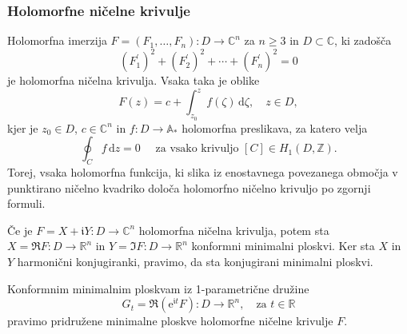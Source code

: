\documentclass[8pt]{beamer}
\theoremstyle{definition}
\theoremstyle{remark}
\theoremstyle{plain}
\numberwithin{equation}{section}  %
\begin{document}
\begin{frame}
    \frametitle{Holomorfne ničelne krivulje}

    Holomorfna imerzija $F=\left(F_1, \ldots, F_n\right): D \rightarrow \mathbb{C}^n$ za $n\geq 3$ in $D\subset \mathbb{C}$, ki zadošča  
    \begin{equation*}
        \left(F_1^{\prime}\right)^2+\left(F_2^{\prime}\right)^2+\cdots+\left(F_n^{\prime}\right)^2=0      
    \end{equation*}
    je \textcolor{red1}{holomorfna ničelna krivulja}. \pause Vsaka taka je oblike 
    \begin{equation*}
        F(z)=c+\int_{z_0}^z f(\zeta) \, \mathrm{d} \zeta, \quad z \in D,
    \end{equation*}
    kjer je $z_0\in D$, $c \in \mathbb{C}^n$ in $f:D \rightarrow \mathbb{A}_*$ holomorfna preslikava, za katero velja
    \begin{equation*}
        \oint_C f \, \mathrm{d} z=0 \quad \text { za vsako krivuljo } [C] \in H_1(D, \mathbb{Z}). 
    \end{equation*}
    \pause 
    Torej, vsaka holomorfna funkcija, ki slika iz enostavnega povezanega območja v punktirano ničelno kvadriko določa holomorfno ničelno krivuljo po zgornji formuli. 
    \pause 
    \vspace{0.8em}
    
    Če je $F=X+\mathfrak{i} Y: D \rightarrow \mathbb{C}^n$ holomorfna ničelna krivulja, potem sta $X=\Re F: D \rightarrow \mathbb{R}^n$ in $Y=\Im F: D \rightarrow \mathbb{R}^n$ konformni minimalni ploskvi. 
    \pause 
    Ker sta $X$ in $Y$ harmonični konjugiranki, pravimo, da sta \textcolor{red1}{konjugirani minimalni ploskvi}. 
    
    \vspace{0.8em}

    Konformnim minimalnim ploskvam iz 1-parametrične družine 
    \begin{equation*}
        G_t=\Re\left(\mathrm{e}^{\mathfrak{i} t} F\right): D \longrightarrow \mathbb{R}^n, \quad \text{za }t \in \mathbb{R}
    \end{equation*}
    pravimo \textcolor{red1}{pridružene minimalne ploskve} holomorfne ničelne krivulje $F$.
\end{frame}
\end{document}
